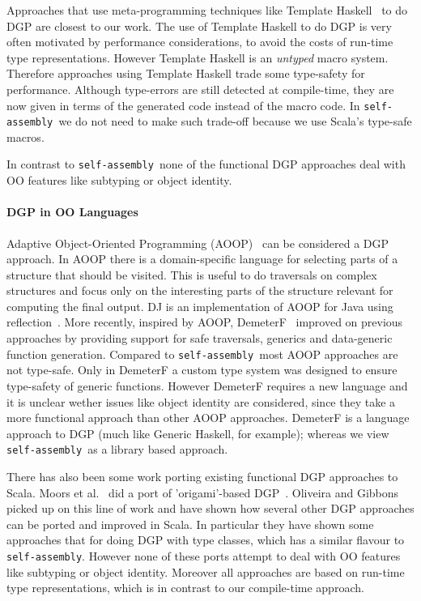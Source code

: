\documentclass[preprint,nocopyrightspace]{sigplanconf}
\newcommand{\selfassembly}{\texttt{self-assembly~}}
\newcommand{\sselfassembly}{\texttt{self-assembly}}
\begin{document}
Approaches that use meta-programming techniques like Template
Haskell~\cite{TemplateYourBoilerplate} to do DGP are closest to our work.
The use of Template Haskell to do
DGP is very often motivated by performance considerations, to avoid the
costs of run-time type representations. However Template Haskell is an
\emph{untyped} macro system. Therefore approaches using Template
Haskell trade some type-safety for performance. Although type-errors
are still detected at compile-time, they are now given in terms of the
generated code instead of the macro code. In \selfassembly we do not
need to make such trade-off because we use Scala's type-safe macros.

In contrast to \selfassembly none of the functional DGP approaches
deal with OO features like subtyping or object identity.

\paragraph{DGP in OO Languages} Adaptive Object-Oriented Programming
(AOOP)~\cite{DemeterBook} can be considered a DGP approach. In AOOP
there is a domain-specific language for selecting parts of a structure
that should be visited. This is useful to do traversals on complex
structures and focus only on the interesting parts of the structure
relevant for computing the final output.  DJ is an implementation of
AOOP for Java using reflection~\cite{DJ}. More recently, inspired by
AOOP, DemeterF~\cite{OOGP} improved on previous approaches by providing support for
safe traversals, generics and data-generic function generation.
Compared to \selfassembly most AOOP approaches are not type-safe. Only in
DemeterF a custom type system was designed to ensure type-safety of
generic functions. However DemeterF requires a new language and it
is unclear wether issues like object identity are considered, since
they take a more functional approach than other AOOP approaches.
DemeterF is a language approach to DGP (much like Generic Haskell, for
example); whereas we view \selfassembly as a library based approach.

There has also been some work porting existing functional DGP
approaches to Scala.  Moors et al.~\cite{OODGPMoors} did a port of
'origami'-based DGP~\cite{DGPGibbons}. Oliveira and
Gibbons~\cite{ScalaGenericProgrammers} picked up on this line of work
and have shown how several other DGP approaches can be ported and
improved in Scala. In particular they have shown some approaches that
for doing DGP with type classes, which has a similar flavour to
\sselfassembly.  However none of these ports attempt to deal with OO
features like subtyping or object identity. Moreover all approaches
are based on run-time type representations, which is in contrast to
our compile-time approach.
\end{document}
